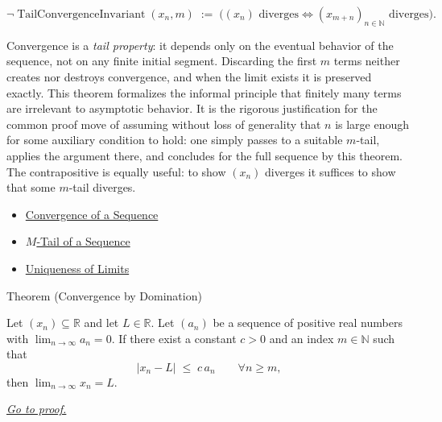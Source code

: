 \begin{remark*}
\[
\lnot\operatorname{TailConvergenceInvariant}(x_n,m)
\;:=\;
\bigl((x_n)\text{ diverges}\Longleftrightarrow (x_{m+n})_{n\in\mathbb{N}}\text{ diverges}\bigr).
\]
\end{remark*}

\begin{remark*}[Interpretation]
Convergence is a \emph{tail property}: it depends only on the
eventual behavior of the sequence, not on any finite initial
segment. Discarding the first $m$ terms neither creates nor
destroys convergence, and when the limit exists it is preserved
exactly. This theorem formalizes the informal principle that
finitely many terms are irrelevant to asymptotic behavior. It is
the rigorous justification for the common proof move of assuming
without loss of generality that $n$ is large enough for some
auxiliary condition to hold: one simply passes to a suitable
$m$-tail, applies the argument there, and concludes for the full
sequence by this theorem. The contrapositive is equally useful:
to show $(x_n)$ diverges it suffices to show that some $m$-tail
diverges.
\end{remark*}

\begin{dependencies}
\begin{itemize}
  \item \hyperref[def:convergent-sequence]{Convergence of a Sequence}
  \item \hyperref[def:m-tail]{$M$-Tail of a Sequence}
  \item \hyperref[thm:uniqueness-of-limits]{Uniqueness of Limits}
\end{itemize}
\end{dependencies}









\begin{theorembox}{Theorem (Convergence by Domination)}
\begin{theorem}
\label{thm:convergence-by-domination}

Let $(x_n) \subseteq \mathbb{R}$ and let $L \in \mathbb{R}$. Let
$(a_n)$ be a sequence of positive real numbers with
$\displaystyle\lim_{n \to \infty} a_n = 0$. If there exist a constant
$c > 0$ and an index $m \in \mathbb{N}$ such that
\[
    |x_n - L| \;\le\; c\, a_n \qquad \forall n \ge m,
\]
then $\displaystyle\lim_{n \to \infty} x_n = L$.

\smallskip
\noindent
\hyperref[prf:convergence-by-domination]{\textit{Go to proof.}}
\end{theorem}
\end{theorembox}

